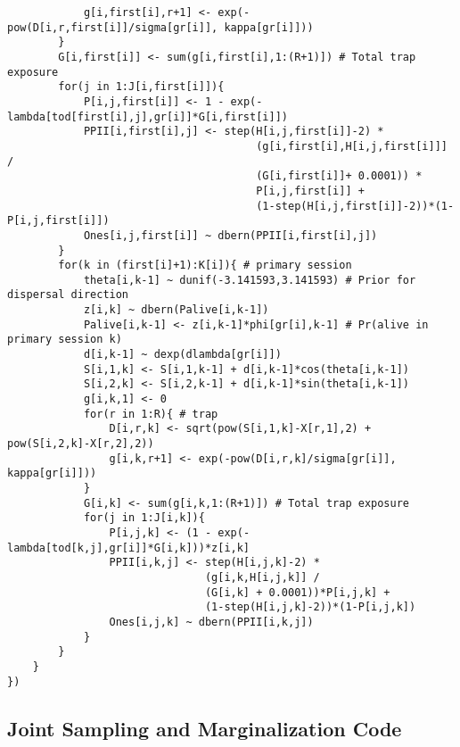 \begin{singlespace}
\begin{small}
\begin{verbatim}
            g[i,first[i],r+1] <- exp(-pow(D[i,r,first[i]]/sigma[gr[i]], kappa[gr[i]]))
        }
        G[i,first[i]] <- sum(g[i,first[i],1:(R+1)]) # Total trap exposure
        for(j in 1:J[i,first[i]]){
            P[i,j,first[i]] <- 1 - exp(-lambda[tod[first[i],j],gr[i]]*G[i,first[i]])
            PPII[i,first[i],j] <- step(H[i,j,first[i]]-2) * 
                                       (g[i,first[i],H[i,j,first[i]]] / 
                                       (G[i,first[i]]+ 0.0001)) * 
                                       P[i,j,first[i]] + 
                                       (1-step(H[i,j,first[i]]-2))*(1-P[i,j,first[i]])
            Ones[i,j,first[i]] ~ dbern(PPII[i,first[i],j])
        }
        for(k in (first[i]+1):K[i]){ # primary session
            theta[i,k-1] ~ dunif(-3.141593,3.141593) # Prior for dispersal direction 
            z[i,k] ~ dbern(Palive[i,k-1])
            Palive[i,k-1] <- z[i,k-1]*phi[gr[i],k-1] # Pr(alive in primary session k)
            d[i,k-1] ~ dexp(dlambda[gr[i]])
            S[i,1,k] <- S[i,1,k-1] + d[i,k-1]*cos(theta[i,k-1])
            S[i,2,k] <- S[i,2,k-1] + d[i,k-1]*sin(theta[i,k-1])
            g[i,k,1] <- 0
            for(r in 1:R){ # trap
                D[i,r,k] <- sqrt(pow(S[i,1,k]-X[r,1],2) + pow(S[i,2,k]-X[r,2],2))
                g[i,k,r+1] <- exp(-pow(D[i,r,k]/sigma[gr[i]], kappa[gr[i]]))
            }
            G[i,k] <- sum(g[i,k,1:(R+1)]) # Total trap exposure
            for(j in 1:J[i,k]){
                P[i,j,k] <- (1 - exp(-lambda[tod[k,j],gr[i]]*G[i,k]))*z[i,k]
                PPII[i,k,j] <- step(H[i,j,k]-2) * 
                               (g[i,k,H[i,j,k]] / 
                               (G[i,k] + 0.0001))*P[i,j,k] + 
                               (1-step(H[i,j,k]-2))*(1-P[i,j,k])
                Ones[i,j,k] ~ dbern(PPII[i,k,j])
            }
        }
    }
})
\end{verbatim}
\end{small}
\end{singlespace}





\newpage
\subsection{Joint Sampling and Marginalization Code}

